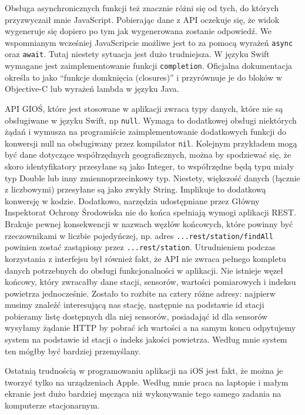 \documentclass[a4paper,11pt,titlepage]{article}
\begin{document}
Obsługa asynchronicznych funkcji też znacznie różni się od tych, do których przyzwyczaił mnie JavaScript. Pobierając dane z API oczekuje się, że widok wygeneruje się dopiero po tym jak wygenerowana zostanie odpowiedź. We wspomnianym wcześniej JavaScripcie możliwe jest to za pomocą wyrażeń \verb|async| oraz \verb|await|. Tutaj niestety sytuacja jest dużo trudniejsza. W języku Swift wymagane jest zaimplementowanie funkcji \verb|completion|. Oficjalna dokumentacja określa to jako ``funkcje domknięcia (closures)'' i przyrównuje je do bloków w Objective-C lub wyrażeń lambda w języku Java.


API GIOŚ, które jest stosowane w aplikacji zwraca typy danych, które nie są obsługiwane w języku Swift, np \verb|null|. Wymaga to dodatkowej obsługi niektórych żądań i wymusza na programiście zaimplementowanie dodatkowych funkcji do konwersji null na obsługiwany przez kompilator \verb|nil|. Kolejnym przykładem mogą być dane dotyczące współrzędnych geograficznych, można by spodziewać się, że skoro identyfikatory przesyłane są jako Integer, to współrzędne będą typu miały typ Double lub inny zmiennoprzecinkowy typ. Niestety, większość danych (łącznie z liczbowymi) przesyłane są jako zwykły String. Implikuje to dodatkową konwersję w kodzie. Dodatkowo, narzędzia udostępniane przez Główny Inspektorat Ochrony Środowiska nie do końca spełniają wymogi aplikacji REST. Brakuje pewnej konsekwencji w nazwach węzłów końcowych, które powinny być rzeczownikami w liczbie pojedyńczej, np. adres \verb|...rest/station/findAll| powinien zostać zastąpiony przez \verb|...rest/station|. Utrudnieniem podczas korzystania z interfejsu był również fakt, że API nie zwraca pełnego kompletu danych potrzebnych do obsługi funkcjonalności w aplikacji. Nie istnieje węzeł końcowy, który zwracałby dane stacji, sensorów, wartości pomiarowych i indeksu powietrza jednocześnie. Zostało to rozbite na cztery różne adresy: najpierw musimy znaleźć interesującą nas stację, następnie na podstawie id stacji pobieramy listę dostępnych dla niej sensorów, posiadająć id dla sensorów wysyłamy żądanie HTTP by pobrać ich wartości a na samym koncu odpytujemy system na podstawie id stacji o indeks jakości powietrza. Według mnie system ten mógłby być bardziej przemyślany.


Ostatnią trudnością w programowaniu aplikacji na iOS jest fakt, że można je tworzyć tylko na urządzeniach Apple. Według mnie praca na laptopie i małym ekranie jest dużo bardziej męcząca niż wykonywanie tego samego zadania na komputerze stacjonarnym.
\end{document}

